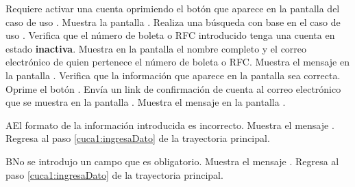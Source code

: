 \begin{UCtrayectoria}
	\UCpaso[\UCactor] Requiere activar una cuenta oprimiendo el botón  que aparece en la pantalla  del caso de uso .
	\UCpaso[\UCsist]  Muestra la pantalla . 
	\UCpaso[\UCactor] Realiza una búsqueda con base en el caso de uso . \label{cuca1:ingresaDato}
	\UCpaso[\UCsist]  Verifica que el número de boleta o RFC introducido tenga una cuenta en estado \textbf{inactiva}. 
	\UCpaso[\UCsist]  Muestra en la pantalla  el nombre completo y el correo electrónico de quien pertenece el número de boleta o RFC. 
	\UCpaso[\UCsist] Muestra el mensaje  en la pantalla .
	\UCpaso[\UCactor] Verifica que la información que aparece en la pantalla  sea correcta. 
	\UCpaso[\UCactor] Oprime el botón . 
	\UCpaso[\UCsist]  Envía un link de confirmación de cuenta al correo electrónico que se muestra en la pantalla . 
	\UCpaso[\UCsist] Muestra el mensaje  en la pantalla .
\end{UCtrayectoria}

\begin{UCtrayectoriaA}{A}{El formato de la información introducida es incorrecto.}
	\UCpaso[\UCsist] Muestra el mensaje .
	\UCpaso[] Regresa al paso \ref{cuca1:ingresaDato} de la trayectoria principal.
\end{UCtrayectoriaA}

\begin{UCtrayectoriaA}{B}{No se introdujo un campo que es obligatorio.}
	\UCpaso[\UCsist] Muestra el mensaje .
	\UCpaso[] Regresa al paso \ref{cuca1:ingresaDato} de la trayectoria principal.
\end{UCtrayectoriaA}

